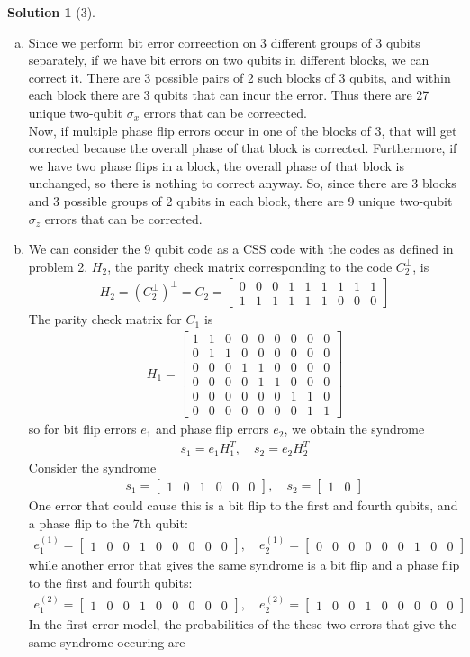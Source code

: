 \documentclass[11pt]{article}
\theoremstyle{definition}
\newtheorem*{solution}{Solution}
\newcommand{\eq}{\begin{equation}\begin{aligned}}
\newcommand{\qe}{\end{aligned}\end{equation}}
\newcommand{\mat}{\begin{bmatrix}}
\newcommand{\tam}{\end{bmatrix}}
\begin{document}
\begin{solution}[3]
  \begin{enumerate}[(a)]
    \item Since we perform bit error correection on 3 different groups of 3 qubits separately, if we have bit errors on two qubits in different blocks, we can correct it. There are 3 possible pairs of 2 such blocks of 3 qubits, and within each block there are 3 qubits that can incur the error. Thus there are 27 unique two-qubit $\sigma_x$ errors that can be correected. \\
    Now, if multiple phase flip errors occur in one of the blocks of 3, that will get corrected because the overall phase of that block is corrected. Furthermore, if we have two phase flips in a block, the overall phase of that block is unchanged, so there is nothing to correct anyway. So, since there are 3 blocks and 3 possible groups of 2 qubits in each block, there are 9 unique two-qubit $\sigma_z$ errors that can be corrected.
    \item We can consider the 9 qubit code as a CSS code with the codes as defined in problem 2. $H_2$, the parity check matrix corresponding to the code $C_2^{\perp}$, is
    \eq
      H_2=(C_2^{\perp})^{\perp}=C_2=\mat
        0&0&0&1&1&1&1&1&1 \\
        1&1&1&1&1&1&0&0&0 
      \tam
    \qe
    The parity check matrix for $C_1$ is
    \eq
      H_1=\mat
        1&1&0&0&0&0&0&0&0\\
        0&1&1&0&0&0&0&0&0\\
        0&0&0&1&1&0&0&0&0\\
        0&0&0&0&1&1&0&0&0\\
        0&0&0&0&0&0&1&1&0\\
        0&0&0&0&0&0&0&1&1
      \tam
    \qe
    so for bit flip errors $e_1$ and phase flip errors $e_2$, we obtain the syndrome
    \eq
      s_1=e_1H_1^T,\quad s_2=e_2H_2^T
    \qe
    Consider the syndrome
    \eq
      s_1=\mat 1&0&1&0&0&0\tam,\quad s_2=\mat 1 & 0\tam
    \qe
    One error that could cause this is a bit flip to the first and fourth qubits, and a phase flip to the 7th qubit:
    \eq
      e_1^{(1)}=\mat 1&0&0&1&0&0&0&0&0 \tam,\quad
      e_2^{(1)}=\mat 0&0&0&0&0&0&1&0&0 \tam
    \qe
    while another error that gives the same syndrome is a bit flip and a phase flip to the first and fourth qubits:
    \eq
      e_1^{(2)}=\mat 1&0&0&1&0&0&0&0&0 \tam,\quad
      e_2^{(2)}=\mat 1&0&0&1&0&0&0&0&0 \tam
    \qe
    In the first error model, the probabilities of the these two errors that give the same syndrome occuring are

\end{enumerate}
\end{solution}
\end{document}
